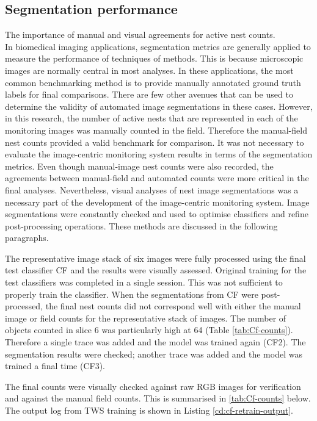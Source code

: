 \subsection{Segmentation performance}
The importance of manual and visual agreements for active nest counts.\\
In biomedical imaging applications, segmentation metrics are generally applied to measure the performance of techniques of methods.  This is because microscopic images are normally central in most analyses. In these applications, the most common benchmarking method is to provide manually annotated ground truth labels for final comparisons. There are few other avenues that can be used to determine the validity of automated image segmentations in these cases. However, in this research, the number of active nests that are represented in each of the monitoring images was manually counted in the field. Therefore the manual-field nest counts provided a valid benchmark for comparison. It was not necessary to evaluate the image-centric monitoring system results in terms of the segmentation metrics. Even though manual-image nest counts were also recorded, the agreements between manual-field and automated counts were more critical in the final analyses. Nevertheless, visual analyses of nest image segmentations was a necessary part of the development of the image-centric monitoring system. Image segmentations were constantly checked and used to optimise classifiers and refine post-processing operations. These methods are discussed in the following paragraphs.

The representative image stack of six images were fully processed using the final test classifier CF and the results were visually assessed. Original training for the test classifiers was completed in a single session. This was not sufficient to properly train the classifier. When the segmentations from CF were post-processed, the final nest counts did not correspond well with either the manual image or field counts for the representative stack of images. The number of objects counted in slice 6 was particularly high at 64 (Table \ref{tab:Cf-counts}). Therefore a single trace was added and the model was trained again (CF2). The segmentation results were checked; another trace was added and the model was trained a final time (CF3). 

The final counts were visually checked against raw \ac{RGB} images for verification and against the manual field counts. This is summarised in \ref{tab:Cf-counts} below. The output log from \ac{TWS} training is shown in Listing \ref{cd:cf-retrain-output}. 

